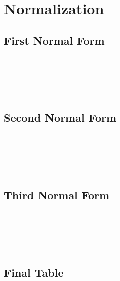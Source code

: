 \chapter{Normalization}
\hrulefill

\section{First Normal Form}
\lipsum[1][1] \\ [\baselineskip]
\lipsum[1][2] \\ [\baselineskip]
\lipsum[1][3] \\ [\baselineskip]
\lipsum[1][4] \\ [\baselineskip]

\section{Second Normal Form}
\lipsum[1][1] \\ [\baselineskip]
\lipsum[1][2] \\ [\baselineskip]
\lipsum[1][3] \\ [\baselineskip]
\lipsum[1][4] \\ [\baselineskip]

\section{Third Normal Form}
\lipsum[1][1] \\ [\baselineskip]
\lipsum[1][2] \\ [\baselineskip]
\lipsum[1][3] \\ [\baselineskip]
\lipsum[1][4] \\ [\baselineskip]

\section{Final Table}
\lipsum[1][1] \\ [\baselineskip]
\lipsum[1][2] \\ [\baselineskip]
\lipsum[1][3] \\ [\baselineskip]